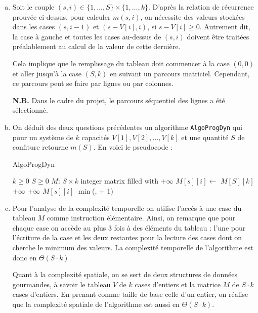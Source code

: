 \documentclass[12pt,a4paper]{article}
\begin{document}
\begin{enumerate}[a)]
 \item Soit le couple $(s,i) \in \{1,\dotsc,S\} \times \{1,\dotsc,k\}$. D'apr\`es la relation de r\'ecurrence prouv\'ee ci-dessus, pour calculer $m(s,i)$, on n\'ecessite des valeurs stock\'ees dans les cases $(s,i-1)$ et $(s-V[i],i)$, si $s-V[i] \geq 0$. Autrement dit, la case \`a gauche et toutes les cases au-dessus de $(s,i)$ doivent \^etre trait\'ees pr\'ealablement au calcul de la valeur de cette derni\`ere.
 
 Cela implique que le remplissage du tableau doit commencer \`a la case $(0,0)$ et aller jusqu'\`a la case $(S,k)$ en suivant un parcours matriciel. Cependant, ce parcours peut se faire par lignes ou par colonnes. 
 
 {\bfseries N.B.} Dans le cadre du projet, le parcours s\'equentiel des lignes a \'et\'e s\'electionn\'e.
 
 \item On d\'eduit des deux questions pr\'ec\'edentes un algorithme \texttt{AlgoProgDyn} qui pour un syst\`eme de $k$ capacit\'es $V[1],V[2],\dotsc,V[k]$ et une quantit\'e $S$ de confiture retourne $m(S)$. En voici le pseudocode :
 
\begin{algorithm}
\caption{AlgoProgDyn}
\begin{algorithmic}[1]
\Require $k \geq 0$ \AND $S \geq 0$
    \State $M$: $S \times k$ integer matrix filled with $+\infty$
            \State $M[s][i] \gets $ 
        \EndFor
    \EndFor
    \State \Return $M[S][k]$
\EndFunction
\Statex
{}
        \State {}
        \State \Return $+\infty$
        \State \Return $+\infty$
    	\State \Return $M[s][i]$
    \Else 
        \State \Return $\min$(,  + 1)
    \EndIf
\EndFunction
\end{algorithmic}
\end{algorithm}

 \item Pour l'analyse de la complexit\'e temporelle on utilise l'acc\`es \`a une case du tableau $M$ comme instruction \'el\'ementaire. Ainsi, on remarque que pour chaque case on acc\`ede au plus 3 fois \`a des \'el\'ements du tableau : l'une pour l'\'ecriture de la case et les deux restantes pour la lecture des cases dont on cherche le minimum des valeurs.
La complexit\'e temporelle de l'algorithme est donc en $\Theta(S\cdot k)$.

Quant \`a la complexit\'e spatiale, on se sert de deux structures de donn\'ees gourmandes, \`a savoir le tableau $V$ de $k$ cases d'entiers et la matrice $M$ de $S\cdot k$ cases d'entiers. En prenant comme taille de base celle d'un entier, on r\'ealise que la complexit\'e spatiale de l'algorithme est aussi en $\Theta(S\cdot k)$.
\end{enumerate}
\end{document}
